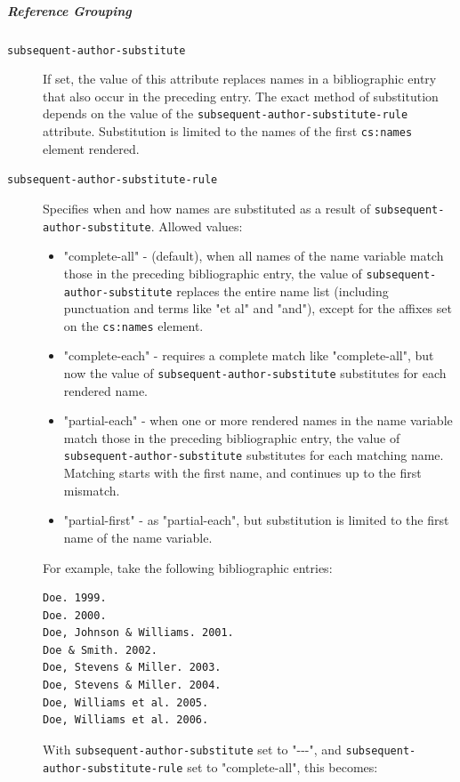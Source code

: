 \hypertarget{reference-grouping}{%
\subparagraph{Reference Grouping}\label{reference-grouping}}

\begin{description}
\item[\texttt{subsequent-author-substitute}]
If set, the value of this attribute replaces names in a bibliographic
entry that also occur in the preceding entry. The exact method of
substitution depends on the value of the
\texttt{subsequent-author-substitute-rule} attribute. Substitution is
limited to the names of the first \texttt{cs:names} element rendered.
\item[\texttt{subsequent-author-substitute-rule}]
Specifies when and how names are substituted as a result of
\texttt{subsequent-author-substitute}. Allowed values:

\begin{itemize}
\tightlist
\item
  "complete-all" - (default), when all names of the name variable match
  those in the preceding bibliographic entry, the value of
  \texttt{subsequent-author-substitute} replaces the entire name list
  (including punctuation and terms like "et al" and "and"), except for
  the affixes set on the \texttt{cs:names} element.
\item
  "complete-each" - requires a complete match like "complete-all", but
  now the value of \texttt{subsequent-author-substitute} substitutes for
  each rendered name.
\item
  "partial-each" - when one or more rendered names in the name variable
  match those in the preceding bibliographic entry, the value of
  \texttt{subsequent-author-substitute} substitutes for each matching
  name. Matching starts with the first name, and continues up to the
  first mismatch.
\item
  "partial-first" - as "partial-each", but substitution is limited to
  the first name of the name variable.
\end{itemize}

For example, take the following bibliographic entries:

\begin{verbatim}
Doe. 1999.
Doe. 2000.
Doe, Johnson & Williams. 2001.
Doe & Smith. 2002.
Doe, Stevens & Miller. 2003.
Doe, Stevens & Miller. 2004.
Doe, Williams et al. 2005.
Doe, Williams et al. 2006.
\end{verbatim}

With \texttt{subsequent-author-substitute} set to "-\/-\/-", and
\texttt{subsequent-author-substitute-rule} set to "complete-all", this
becomes:


\end{description}
